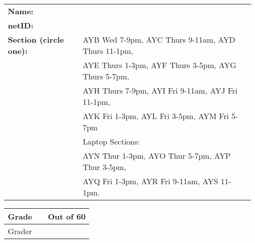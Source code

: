 \documentclass[11pt]{article}
\begin{document}
\begin{table}[h]
\centering
\renewcommand{\arraystretch}{1.5}
\begin{tabular}{l l }
\bfseries{Name:} & \\
\bfseries{netID:} & \\
\bfseries{Section} (circle one): 
 & \hspace{.2in} AYB Wed 7-9pm, AYC Thurs 9-11am, AYD Thurs 11-1pm, \\
 & \hspace{.2in} AYE Thurs 1-3pm, AYF Thurs 3-5pm, AYG Thurs 5-7pm, \\
 & \hspace{.2in} AYH Thurs 7-9pm, AYI Fri 9-11am, AYJ Fri 11-1pm, \\
 & \hspace{.2in} AYK Fri 1-3pm, AYL Fri 3-5pm, AYM Fri 5-7pm\\
 & Laptop Sections: \\
 & \hspace{.2in} AYN Thur 1-3pm, AYO Thur 5-7pm, AYP Thur 3-5pm, \\
 & \hspace{.2in} AYQ Fri 1-3pm, AYR Fri 9-11am, AYS 11-1pm.\\
\end{tabular}
\end{table}

\vspace{.1in}
\begin{table}[h]
\centering
\renewcommand{\arraystretch}{2}
\begin{tabular}{|l| l| c|}
\hline
Grade & \hspace{.75in} & Out of 60\\
\hline
Grader & \multicolumn{2}{|c|}{}\\
\hline
\end{tabular}
\end{table}



\end{document}
